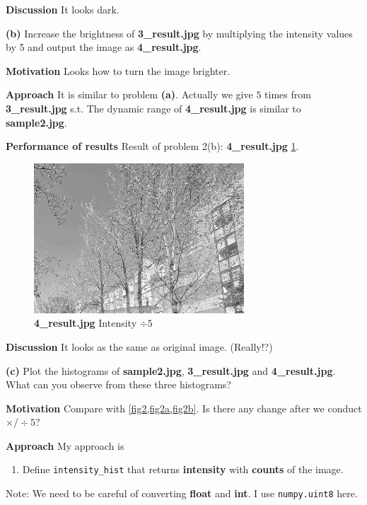 \textbf{Discussion}
It looks dark.

\textbf{(b)} Increase the brightness of \textbf{3\_result.jpg} by multiplying the intensity values by 5 and output the image as \textbf{4\_result.jpg}.

\textbf{Motivation}
Looks how to turn the image brighter.

\textbf{Approach}
It is similar to problem \textbf{(a)}. Actually we give \(5\) times from \textbf{3\_result.jpg} s.t. The dynamic range of \textbf{4\_result.jpg} is similar to \textbf{sample2.jpg}.

\textbf{Performance of results}
Result of problem 2(b): \textbf{4\_result.jpg} \cref{fig2b}.
\begin{figure}
    \centering
    \includegraphics[width=0.7\textwidth]{image/4_result.jpg}
    \caption{\textbf{4\_result.jpg} Intensity $\div 5$}
    \label{fig2b}
\end{figure}

\textbf{Discussion}
It looks as the same as original image. (Really!?)

\textbf{(c)} {Plot the histograms} of \textbf{sample2.jpg}, \textbf{3\_result.jpg} and \textbf{4\_result.jpg}. What can you observe from these three
histograms?

\textbf{Motivation}
Compare with \cref{fig2,fig2a,fig2b}. Is there any change after we conduct $\times / \div 5$?

\textbf{Approach}
My approach is
\begin{enumerate}
  \item Define \texttt{intensity\_hist} that returns \textbf{intensity} with \textbf{counts} of the image.
\end{enumerate}
Note: We need to be careful of converting \textbf{float} and \textbf{int}. I use \texttt{numpy.uint8} here.

